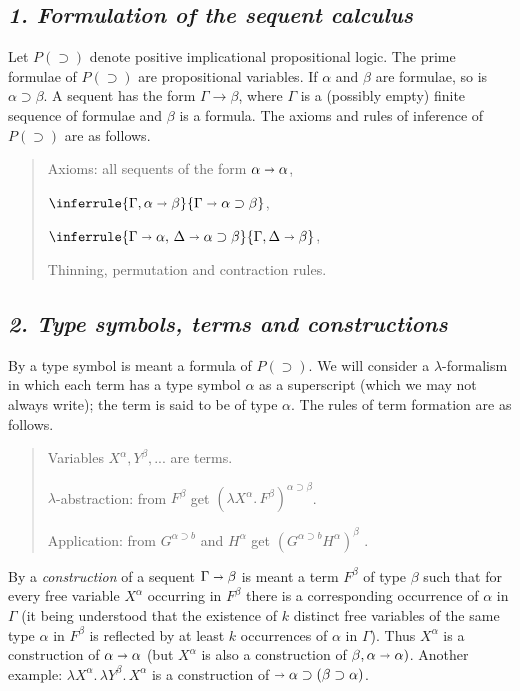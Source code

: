 \documentclass[12pt]{article}
\def\imp{\shortrightarrow}
\def\l{\lambda}
\def\D{D}
\def\limp{\supset}
\def\PI{P(\limp)}
\def\G{\Gamma}
\def\a{\alpha}
\def\b{\beta}
\def\D{\Delta}
\def\ab{\a \imp \b}
\begin{document}
\subsection*{\it 1. Formulation of the sequent calculus}

Let $\PI$ denote positive implicational propositional logic. The prime formulae of $\PI$ are propositional variables. If $\a$ and $\b
$ are formulae, so is $\a \limp \b$. A sequent has the form $\G \rightarrow \b$, where $\G$ is a (possibly empty) finite sequence of formulae and $\b$ is a formula. The axioms and rules of inference of $\PI$ are as follows.

\begin{quote}
\begin{description}[font=\normalfont]

\item[(1.1)] Axioms: all sequents of the form $\a \imp \a$,

\item[(1.2)] $\inferrule {\G, \ab}{\G \imp \a \limp \b}$,

\item[(1.3)] $\inferrule {\G \imp \a, \, \D \imp \a \limp \b}{\G, \D \imp \b}$,

\item[(1.4)] Thinning, permutation and contraction rules.
\end{description}
\end{quote}

\subsection*{\it 2. Type symbols, terms and constructions}

By a type symbol is meant a formula of $\PI$. We will consider a $\l$-formalism in which each term has a type symbol $\a$ as a superscript (which we may not always write); the term is said to be of type $\a$. The rules of term formation are as follows.

\begin{quote}
\begin{description}[font=\normalfont]

\item[(2.1)] Variables $X^\a, Y^\b, ... $ are terms.

\item[(2.2)] $\l$-abstraction: from $F^\b$ get $(\l X^\a .\, F^\b )^{\a \limp \b}$.

\item[(2.3)] Application: from $G^{\a \limp b}$ and $H^\a$ get $(G^{\a \limp b} H^\a )^\b$ .
\end{description}
\end{quote}
By a {\it construction} of a sequent $\G \imp \b$ is meant a term $F^\b$ of type $\b$ such that for
every free variable $X^\a$ occurring in $F^\b$ there is a corresponding occurrence of $\a$
in $\G$ (it being understood that the existence of $k$ distinct free variables of the
same type $\a$ in $F^\b$ is reflected by at least $k$ occurrences of $\a$ in $\G$). Thus $X^\a$ is
a construction of $\a \imp \a$ (but $X^\a$ is also a construction of $\b, \a \imp \a)$. Another 
example: $\l X^\a .\, \l Y^\b .\, X^\a$ is a construction of $\imp \a \limp (\b \limp \a)$.
\end{document}

